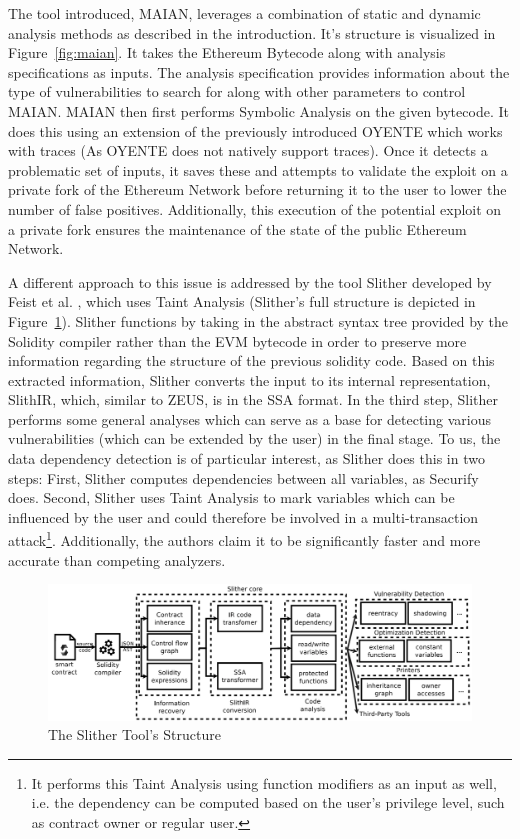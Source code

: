 \documentclass[letterpaper,twocolumn,10pt]{article}
\begin{document}
The tool introduced, MAIAN, leverages a combination of static and dynamic analysis methods as described in the introduction. It's structure is visualized in Figure~\ref{fig:maian}. It takes the Ethereum Bytecode along with analysis specifications as inputs. The analysis specification provides information about the type of vulnerabilities to search for along with other parameters to control MAIAN. MAIAN then first performs Symbolic Analysis on the given bytecode. It does this using an extension of the previously introduced OYENTE which works with traces (As OYENTE does not natively support traces). Once it detects a problematic set of inputs, it saves these and attempts to validate the exploit on a private fork of the Ethereum Network before returning it to the user to lower the number of false positives. Additionally, this execution of the potential exploit on a private fork ensures the maintenance of the state of the public Ethereum Network.

A different approach to this issue is addressed by the tool Slither developed by Feist et al. \cite{feist_grieco_groce_2019}, which uses Taint Analysis (Slither's full structure is depicted in Figure~\ref{fig:slither}). Slither functions by taking in the abstract syntax tree provided by the Solidity compiler rather than the EVM bytecode in order to preserve more information regarding the structure of the previous solidity code. Based on this extracted information, Slither converts the input to its internal representation, SlithIR, which, similar to ZEUS, is in the SSA format. In the third step, Slither performs some general analyses which can serve as a base for detecting various vulnerabilities (which can be extended by the user) in the final stage. To us, the data dependency detection is of particular interest, as Slither does this in two steps: First, Slither computes dependencies between all variables, as Securify does. Second, Slither uses Taint Analysis to mark variables which can be influenced by the user and could therefore be involved in a multi-transaction attack\footnote{It performs this Taint Analysis using function modifiers as an input as well, i.e. the dependency can be computed based on the user's privilege level, such as contract owner or regular user.}. Additionally, the authors claim it to be significantly faster and more accurate than competing analyzers.

\begin{figure}
\begin{center}
\includegraphics[scale=0.15]{Slither}
\end{center}
\caption{\label{fig:slither} The Slither Tool's Structure\cite{feist_grieco_groce_2019}}
\end{figure}
\end{document}
